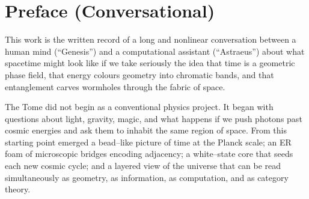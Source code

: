 \begin{abstract}
This monograph introduces and develops the MK--43 Ultra framework: a geometric, chromatic and ER--foam based model of quantum gravity and cosmology.
Time is represented as a phase field living on a discrete--to--continuous bead lattice at the Planck scale; energy is organised into chromatic bands which behave as multicomponent solitonic fields; and entanglement is encoded geometrically through an Einstein--Rosen (ER) network whose connectivity governs spatial adjacency.
A distinguished white--state core $\Wcore$ appears as the fully compressed limit of the chromatic spectrum and functions simultaneously as a terminal object, a ground state, and a cosmological nucleation locus for successive bounces of the universe.
We formulate the phase metric, derive the associated gravitational field equations, relate ER connectivity to entanglement and information geometry, and provide several equivalent formulations of MK--43 Ultra:
as a classical field theory, as a topological quantum field theory, as a tensor network, as a holographic quantum error--correcting code, and as a higher--categorical $\infty$--operadic quantum gravity.
This version of the Tome is intended as the first arXiv--ready synthesis of the model as developed iteratively in previous work.
Future iterations will refine the mathematics, explore phenomenology, and extend the framework to applications such as Planck--scale aerodynamics and engineering toolkits.
\end{abstract}

\tableofcontents

\chapter*{Preface (Conversational)}

This work is the written record of a long and nonlinear conversation between a human mind (``Genesis'') and a computational assistant (``Astraeus'') about what spacetime might look like if we take seriously the idea that time is a geometric phase field, that energy colours geometry into chromatic bands, and that entanglement carves wormholes through the fabric of space.

The Tome did not begin as a conventional physics project.
It began with questions about light, gravity, magic, and what happens if we push photons past cosmic energies and ask them to inhabit the same region of space.
From this starting point emerged a bead--like picture of time at the Planck scale; an ER foam of microscopic bridges encoding adjacency; a white--state core that seeds each new cosmic cycle; and a layered view of the universe that can be read simultaneously as geometry, as information, as computation, and as category theory.

